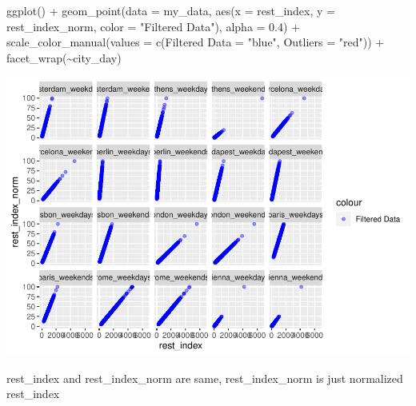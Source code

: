 \documentclass[
]{article}
\newenvironment{Shaded}{\begin{snugshade}}{\end{snugshade}}
\newcommand{\AttributeTok}[1]{\textcolor[rgb]{0.77,0.63,0.00}{#1}}
\newcommand{\FloatTok}[1]{\textcolor[rgb]{0.00,0.00,0.81}{#1}}
\newcommand{\FunctionTok}[1]{\textcolor[rgb]{0.00,0.00,0.00}{#1}}
\newcommand{\NormalTok}[1]{#1}
\newcommand{\OtherTok}[1]{\textcolor[rgb]{0.56,0.35,0.01}{#1}}
\newcommand{\SpecialCharTok}[1]{\textcolor[rgb]{0.00,0.00,0.00}{#1}}
\newcommand{\StringTok}[1]{\textcolor[rgb]{0.31,0.60,0.02}{#1}}
\begin{document}
\begin{Shaded}
\begin{Highlighting}[]
\FunctionTok{ggplot}\NormalTok{() }\SpecialCharTok{+} \FunctionTok{geom\_point}\NormalTok{(}\AttributeTok{data =}\NormalTok{ my\_data, }\FunctionTok{aes}\NormalTok{(}\AttributeTok{x =}\NormalTok{ rest\_index, }\AttributeTok{y =}\NormalTok{ rest\_index\_norm,}
    \AttributeTok{color =} \StringTok{"Filtered Data"}\NormalTok{), }\AttributeTok{alpha =} \FloatTok{0.4}\NormalTok{) }\SpecialCharTok{+} \FunctionTok{scale\_color\_manual}\NormalTok{(}\AttributeTok{values =} \FunctionTok{c}\NormalTok{(}\StringTok{\textasciigrave{}}\AttributeTok{Filtered Data}\StringTok{\textasciigrave{}} \OtherTok{=} \StringTok{"blue"}\NormalTok{,}
    \AttributeTok{Outliers =} \StringTok{"red"}\NormalTok{)) }\SpecialCharTok{+} \FunctionTok{facet\_wrap}\NormalTok{(}\SpecialCharTok{\textasciitilde{}}\NormalTok{city\_day)}
\end{Highlighting}
\end{Shaded}

\includegraphics{Project_files/figure-latex/unnamed-chunk-19-2.pdf}

rest\_index and rest\_index\_norm are same, rest\_index\_norm is just
normalized rest\_index
\end{document}
